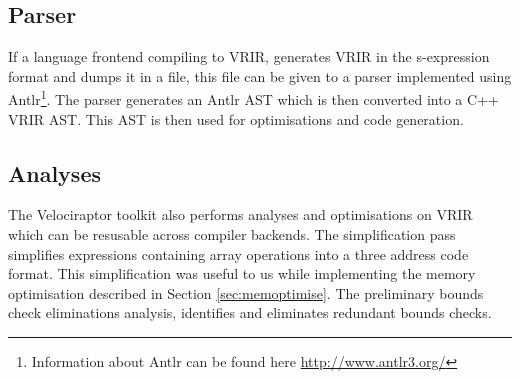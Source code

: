 \subsection{Parser}
If a language frontend compiling to VRIR, generates VRIR in the s-expression format and dumps it in a file, this file can be given to a parser implemented using Antlr\footnote{Information about Antlr can be found here \url{http://www.antlr3.org/}}. The parser generates an Antlr AST which is then converted into a C++ VRIR AST. This AST is then used for optimisations and code generation.  
\subsection{Analyses}
The Velociraptor toolkit also performs analyses and optimisations on VRIR which  can be resusable across compiler backends. The simplification pass simplifies expressions containing array operations into a three address code format. This simplification was useful to us while implementing the memory optimisation described in Section \ref{sec:memoptimise}. The preliminary bounds check eliminations analysis, identifies and eliminates redundant bounds checks.

